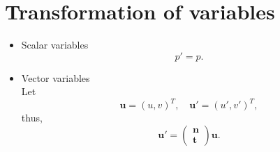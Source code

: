 \documentclass[review]{elsarticle}
\begin{document}
\section{Transformation of variables}
\begin{itemize}
	\item Scalar variables\\
		\begin{equation}\label{scalarTransformation}
			p'=p.
		\end{equation}
	\item Vector variables\\
		Let 
		\begin{equation}\label{vector_u}
			\bm{u}=(u, v)^T,\quad \bm{u}'=(u', v')^T,
		\end{equation}
		thus,
		\begin{equation}\label{vectorTransformation}
			\bm{u}'=\left(
				\begin{array}{c}
					\bm{n} \\
					\bm{t}
				\end{array}
			\right)\bm{u}.
		\end{equation}
\end{itemize}
\end{document}
